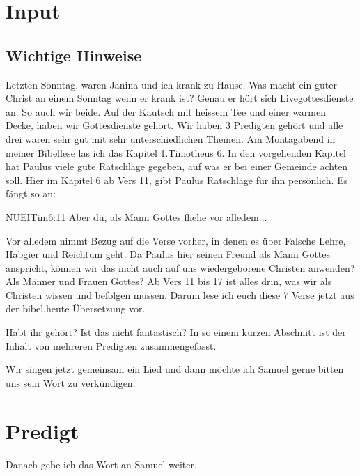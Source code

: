 \section{ Input }
\begin{spacing}{1.5}
\subsection{ Wichtige Hinweise }

Letzten Sonntag, waren Janina und ich krank zu Hause. Was macht ein guter Christ an einem Sonntag wenn er krank ist? Genau er hört sich Livegottesdienste an. So auch wir beide. Auf der Kautsch mit heissem Tee und einer warmen Decke, haben wir Gottesdienste gehört. Wir haben 3 Predigten gehört und alle drei waren sehr gut mit sehr unterschiedlichen Themen. Am Montagabend in meiner Bibellese las ich das Kapitel 1.Timotheus 6. In den vorgehenden Kapitel hat Paulus viele gute Ratschläge gegeben, auf was er bei einer Gemeinde achten soll. Hier im Kapitel 6 ab Vers 11, gibt Paulus Ratschläge für ihn persönlich. Es fängt so an:

\begin{bibelbox}{NUE}{ITim}{6:11}
Aber du, als Mann Gottes fliehe vor alledem...
\end{bibelbox}

 \glqq Vor alledem \grqq{} nimmt Bezug auf die Verse vorher, in denen es über Falsche Lehre, Habgier und Reichtum geht. Da Paulus hier seinen Freund als Mann Gottes anspricht, können wir das nicht auch auf uns wiedergeborene Christen anwenden? Als Männer und Frauen Gottes? Ab Vers 11 bis 17 ist alles drin, was wir als Christen wissen und befolgen müssen. Darum lese ich euch diese 7 Verse jetzt aus der bibel.heute Übersetzung vor.

Habt ihr gehört? Ist das nicht fantastisch? In so einem kurzen Abschnitt ist der Inhalt von mehreren Predigten zusammengefasst. 

Wir singen jetzt gemeinsam ein Lied und dann möchte ich Samuel gerne bitten uns sein Wort zu verkündigen.

\end{spacing}


\section{Predigt}

Danach gebe ich das Wort an Samuel weiter.

